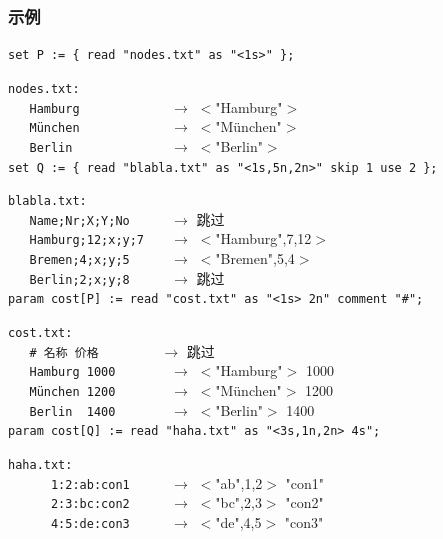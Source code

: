 \subsubsection{示例}
{\small
\verb|set P := { read "nodes.txt" as "<1s>" };|

\smallskip
\noindent\verb|nodes.txt:|\\
\verb|   Hamburg            | $\rightarrow$ $<$"Hamburg"$>$\\
\verb|   München            | $\rightarrow$ $<$"München"$>$\\
\verb|   Berlin             | $\rightarrow$ $<$"Berlin"$>$\\

\smallskip
\noindent\verb|set Q := { read "blabla.txt" as "<1s,5n,2n>" skip 1 use 2 };|

\smallskip
\noindent\verb|blabla.txt:|\\
\verb|   Name;Nr;X;Y;No     | $\rightarrow$ 跳过\\
\verb|   Hamburg;12;x;y;7   | $\rightarrow$ $<$"Hamburg",7,12$>$\\
\verb|   Bremen;4;x;y;5     | $\rightarrow$ $<$"Bremen",5,4$>$\\
\verb|   Berlin;2;x;y;8     | $\rightarrow$ 跳过\\

\smallskip
\noindent\verb|param cost[P] := read "cost.txt" as "<1s> 2n" comment "#";|

\smallskip
\noindent\verb|cost.txt:|\\
\verb|   # 名称 价格        | $\rightarrow$ 跳过\\
\verb|   Hamburg 1000       | $\rightarrow$ $<$"Hamburg"$>$ 1000\\
\verb|   München 1200       | $\rightarrow$ $<$"München"$>$ 1200\\
\verb|   Berlin  1400       | $\rightarrow$ $<$"Berlin"$>$ 1400\\

\smallskip
\noindent\verb|param cost[Q] := read "haha.txt" as "<3s,1n,2n> 4s";|

\smallskip
\noindent\verb|haha.txt:|\\
\verb|      1:2:ab:con1     | $\rightarrow$ $<$"ab",1,2$>$ "con1"\\
\verb|      2:3:bc:con2     | $\rightarrow$ $<$"bc",2,3$>$ "con2"\\
\verb|      4:5:de:con3     | $\rightarrow$ $<$"de",4,5$>$ "con3"\\
}

